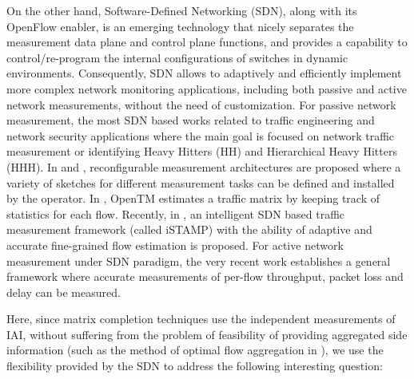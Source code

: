 
On the other hand, Software-Defined Networking (SDN), along with its OpenFlow enabler, is an emerging technology that nicely separates the measurement data plane and control plane functions, and provides a capability to control/re-program the internal configurations of switches in dynamic environments. Consequently, SDN allows to adaptively and efficiently implement more complex network monitoring applications, including both passive and active network measurements, without the need of customization. For passive network measurement, the most SDN based works related to traffic engineering and network security applications where the main goal is focused on network traffic measurement or identifying Heavy Hitters (HH) and Hierarchical Heavy Hitters (HHH). In \cite{MYu:2011} and \cite{MYu:2013}, reconfigurable measurement architectures are proposed where a variety of sketches for different measurement tasks can be defined and installed by the operator. In \cite{Tootoonchian:2010}, OpenTM estimates a traffic matrix by keeping track of statistics for each flow. Recently, in \cite{IF14iSTAMP:2014}, an intelligent SDN based traffic measurement framework (called iSTAMP) with the ability of adaptive and accurate fine-grained flow estimation is proposed. For active network measurement under SDN paradigm, the very recent work \cite{Adrichen:2014} establishes a general framework where accurate measurements of per-flow throughput, packet loss and delay can be measured.

Here, since matrix completion techniques use the independent measurements of IAI, without suffering from the problem of feasibility of providing aggregated side information (such as the method of optimal flow aggregation in \cite{IF14iSTAMP:2014}), we use the flexibility provided by the SDN to address the following interesting question:

